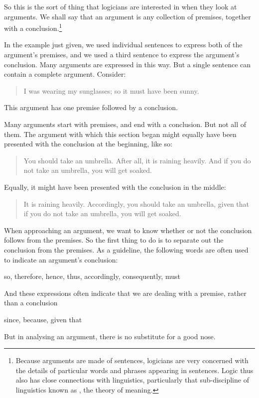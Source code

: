 So this is the sort of thing that logicians are interested in when they look at arguments. We shall say that an argument is any collection of premises, together with a conclusion.\footnote{Because arguments are made of sentences, logicians are very concerned with the details of particular words and phrases appearing in sentences. Logic thus also has close connections with linguistics, particularly that sub-discipline of linguistics known as , the theory of meaning.}

In the example just given, we used individual sentences to express both of the argument's premises, and we used a third sentence to express the argument's conclusion. Many arguments are expressed in this way. But a single sentence can contain a complete argument. Consider:
	\begin{quote}
		 I was wearing my sunglasses; so it must have been sunny.
	\end{quote}
This argument has one premise followed by a conclusion. 

Many arguments start with premises, and end with a conclusion. But not all of them. The argument with which this section began might equally have been presented with the conclusion at the beginning, like so:
	\begin{quote}
		You should take an umbrella. After all, it is raining heavily. And if you do not take an umbrella, you will get soaked. 
	\end{quote}
Equally, it might have been presented with the conclusion in the middle:
	\begin{quote}
		It is raining heavily. Accordingly, you should take an umbrella, given that if you do not take an umbrella, you will get soaked.
	\end{quote}
When approaching an argument, we want to know whether or not the conclusion follows from the premises. So the first thing to do is to separate out the conclusion from the premises. As a guideline, the following words are often used to indicate an argument's conclusion:
	\begin{center}
		so, therefore, hence, thus, accordingly, consequently, must
	\end{center}
And these expressions often indicate that we are dealing with a premise, rather than a conclusion
	\begin{center}
		since, because, given that
	\end{center}
But in analysing an argument, there is no substitute for a good nose.

